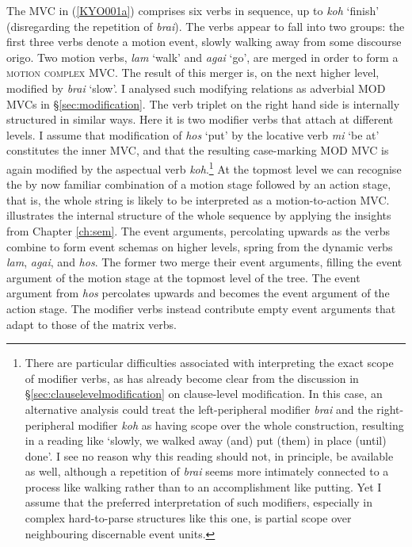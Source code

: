 \largerpage
The MVC in (\ref{KYO001a}) comprises six verbs in sequence, up to \textit{koh} `finish' (disregarding the repetition of \textit{brai}). The verbs appear to fall into two groups: the first three verbs denote a motion event, slowly walking away from some discourse origo. Two motion verbs, \textit{lam} `walk' and \textit{agai} `go', are merged in order to form a \textsc{motion complex} MVC. The result of this merger is, on the next higher level, modified by \textit{brai} `slow'. I analysed such modifying relations as adverbial MOD MVCs in §\ref{sec:modification}. The verb triplet on the right hand side is internally structured in similar ways. Here it is two modifier verbs that attach at different levels. I assume that modification of \textit{hos} `put' by the locative verb \textit{mi} `be at' constitutes the inner MVC, and that the resulting case-marking MOD MVC is again modified by the aspectual verb \textit{koh}.\footnote{There are particular difficulties associated with interpreting the exact scope of modifier verbs, as has already become clear from the discussion in §\ref{sec:clauselevelmodification} on clause-level modification. In this case, an alternative analysis could treat the left-peripheral modifier \textit{brai} and the right-peripheral modifier \textit{koh} as having scope over the whole construction, resulting in a reading like `slowly, we walked away (and) put (them) in place (until) done'. I see no reason why this reading should not, in principle, be available as well, although a repetition of \textit{brai} seems more intimately connected to a process like walking rather than to an accomplishment like putting. Yet I assume that the preferred interpretation of such modifiers, especially in complex hard-to-parse structures like this one, is partial scope over neighbouring discernable event units.} At the topmost level we can recognise the by now familiar combination of a motion stage followed by an action stage, that is, the whole string is likely to be interpreted as a motion-to-action MVC.  illustrates the internal structure of the whole sequence by applying the insights from Chapter \ref{ch:sem}. The event arguments, percolating upwards as the verbs combine to form event schemas on higher levels, spring from the dynamic verbs \textit{lam}, \textit{agai}, and \textit{hos}. The former two merge their event arguments, filling the event argument of the motion stage at the topmost level of the tree. The event argument from \textit{hos} percolates upwards and becomes the event argument of the action stage. The modifier verbs instead contribute empty event arguments that adapt to those of the matrix verbs.

